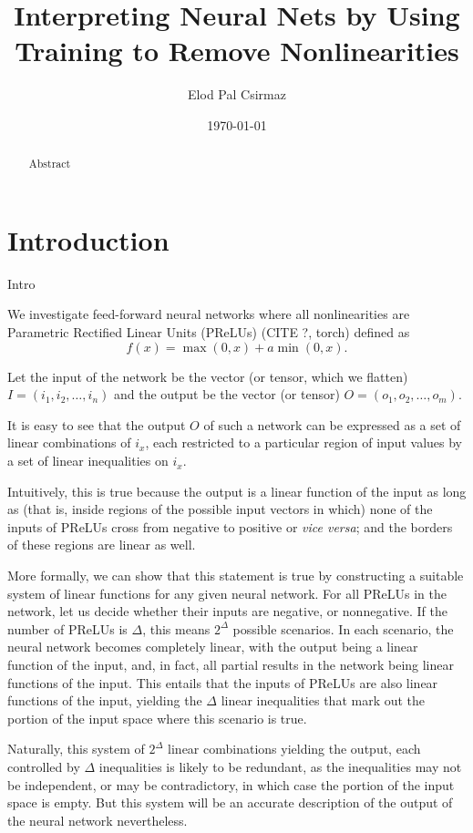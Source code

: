 \documentclass{article}[12pt]
\title{Interpreting Neural Nets by Using Training to Remove Nonlinearities}
\author{Elod Pal Csirmaz}
\date{\today}
\begin{document}
\maketitle

\begin{abstract}
Abstract
\end{abstract}

\section{Introduction}

Intro

We investigate feed-forward neural networks
where all nonlinearities are Parametric Rectified Linear Units (PReLUs)
(CITE ?, torch) %
defined as
\[ f(x) = \max(0, x) + a \min(0, x). \]

Let the input of the network be the vector (or tensor, which we flatten) $I=(i_1, i_2, \ldots, i_n)$
and the output be the vector (or tensor) $O=(o_1, o_2, \ldots, o_m)$.

It is easy to see that the output $O$ of such a network can be expressed
as a set of linear combinations of $i_x$, each restricted to a particular region of input values
by a set of linear inequalities on $i_x$.

Intuitively, this is true because the output is a linear function of the input
as long as (that is, inside regions of the possible input vectors in which) none of the inputs of PReLUs
cross from negative to positive or \emph{vice versa}; and the borders of these regions
are linear as well.

More formally, we can show that this statement is true by constructing a suitable
system of linear functions for any given neural network.
For all PReLUs in the network, let us decide whether their inputs are negative, or nonnegative.
If the number of PReLUs is $\Delta$, this means $2^\Delta$ possible scenarios.
In each scenario, the neural network becomes completely linear, with the output being a linear function of the input,
and, in fact, all partial results in the network being linear functions of the input.
This entails that the inputs of PReLUs are also linear functions of the input, yielding
the $\Delta$ linear inequalities that mark out the portion of the input space where this scenario is true.

Naturally, this system of $2^\Delta$ linear combinations yielding the output, each controlled by $\Delta$
inequalities is likely to be redundant, as the inequalities may not be independent,
or may be contradictory, in which case the portion of the input space is empty.
But this system will be an accurate description of the output of the neural network nevertheless.
\end{document}
